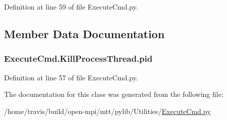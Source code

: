 Definition at line 59 of file Execute\-Cmd.\-py.



\subsection{Member Data Documentation}
\hypertarget{class_execute_cmd_1_1_kill_process_thread_a66ec3fdeb7fad04cd760e3ede0903e65}{
\subsubsection[{pid}]{\setlength{\rightskip}{0pt plus 5cm}Execute\-Cmd.\-Kill\-Process\-Thread.\-pid}}\label{class_execute_cmd_1_1_kill_process_thread_a66ec3fdeb7fad04cd760e3ede0903e65}


Definition at line 57 of file Execute\-Cmd.\-py.



The documentation for this class was generated from the following file\-:\begin{DoxyCompactItemize}
\item 
/home/travis/build/open-\/mpi/mtt/pylib/\-Utilities/\hyperlink{_execute_cmd_8py}{Execute\-Cmd.\-py}\end{DoxyCompactItemize}
